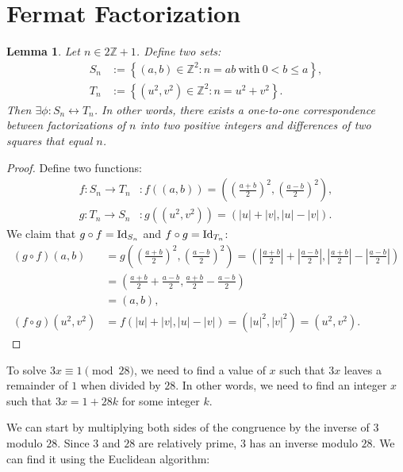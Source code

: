 \documentclass[12pt,openany]{book}
\newtheorem{lemma}[theorem]{Lemma}
\theoremstyle{definition}
\newcommand{\set}[1]{\left\{#1\right\}}
\newcommand{\Z}{\mathbb{Z}}
\newcommand{\of}[1]{\left( #1 \right)}
\newcommand{\abs}[1]{\left\lvert #1 \right\rvert}
\newcommand{\id}{\operatorname{\textnormal{Id}}}
\begin{document}
	\newpage
	\section{Fermat Factorization}
	\begin{tcolorbox}[colback=white,colframe=lemcolor,arc=5pt,title={\color{white}\bf }]
		\begin{lemma}
			Let $n\in 2\Z+1$. Define two sets: \begin{align*}
				S_n&:=\set{(a,b)\in\Z^2:n=ab\ \text{with}\ 0<b\leq a},\\
				T_n&:=\set{\of{u^2,v^2}\in\Z^2:n=u^2+v^2}.
			\end{align*} Then $\exists\phi:S_n\leftrightarrow T_n$. In other words, there exists a one-to-one correspondence between factorizations of $n$ into two positive integers and differences of two squares that equal $n$.
		\end{lemma}
	\end{tcolorbox}
	\begin{proof}
		Define two functions: \begin{align*}
			f:S_n\to T_n&:f\of{\of{a,b}}=\of{\of{\frac{a+b}{2}}^2,\of{\frac{a-b}{2}}^2},\\
			g:T_n\to S_n&:g\of{\of{u^2,v^2}}=\of{\abs{u}+\abs{v},\abs{u}-\abs{v}}.
		\end{align*} We claim that $g\circ f=\id_{S_n}$ and $f\circ g=\id_{T_n}$:\begin{align*}
		\of{g\circ f}(a,b)&=g\of{\of{\frac{a+b}{2}}^2,\of{\frac{a-b}{2}}^2}=\of{\abs{\frac{a+b}{2}}+\abs{\frac{a-b}{2}},\abs{\frac{a+b}{2}}-\abs{\frac{a-b}{2}}}\\
		&=\of{{\frac{a+b}{2}}+{\frac{a-b}{2}},{\frac{a+b}{2}}-{\frac{a-b}{2}}}\\
		&=\of{a,b},\\
		\of{f\circ g}\of{u^2,v^2}&=f\of{\abs{u}+\abs{v},\abs{u}-\abs{v}}=\of{\abs{u}^2,\abs{v}^2}=\of{u^2,v^2}.
	\end{align*}
	\end{proof}

To solve $3x\equiv 1\pmod{28}$, we need to find a value of $x$ such that $3x$ leaves a remainder of $1$ when divided by $28$. In other words, we need to find an integer $x$ such that $3x = 1 + 28k$ for some integer $k$.

We can start by multiplying both sides of the congruence by the inverse of $3$ modulo $28$. Since $3$ and $28$ are relatively prime, $3$ has an inverse modulo $28$. We can find it using the Euclidean algorithm:
\end{document}

